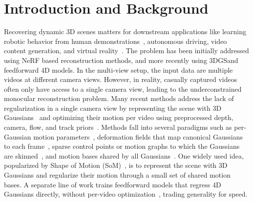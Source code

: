 \section{Introduction and Background}
\label{sec:intro}


Recovering dynamic 3D scenes matters for downstream applications like learning robotic behavior from human demonstrations~\cite{paliwal2026dexterous}, autonomous driving\cite{}, video content generation\cite{}, and virtual reality~\cite{}.  
The problem has been initially addressed using NeRF based reconstruction methods\cite{}, and more recently using 3DGS\cite{}and feedforward 4D models. In the multi-view setup, the input data are multiple videos at different camera views. However, in reality, casually captured videos often only have access to a single camera view, leading to the underconstrained monocular reconstruction problem. Many recent methods address the lack of regularization in a single camera view by representing the scene with 3D Gaussians~\cite{kerbl20233d} and optimizing their motion per video using preprocessed depth, camera, flow, and track priors~\cite{lei2025mosca, wang2025shape, stearns2024dynamic, wang2025gflow}. 
Methods fall into several paradigms such as per-Gaussian motion parameters~\cite{stearns2024dynamic, wang2025gflow}, deformation fields that map canonical Gaussians to each frame~, sparse control points or motion graphs to which the Gaussians are skinned~\cite{huang2024sc, lei2025mosca}, and motion bases shared by all Gaussians~\cite{kratimenos2024dynmf, wang2025shape, liang2025himor}. 
One widely used idea, popularized by Shape of Motion (SoM)~\cite{wang2025shape}, is to represent the scene with 3D Gaussians and regularize their motion through a small set of shared motion bases.
A separate line of work trains feedforward models that regress 4D Gaussians directly, without per-video optimization~\cite{lin2026movies}, trading generality for speed.

